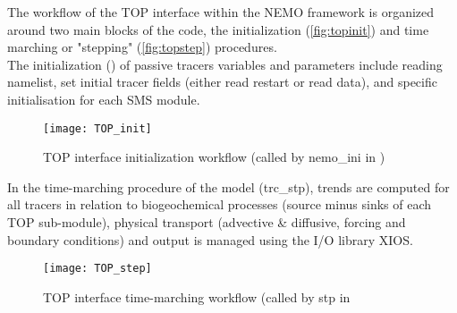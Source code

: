 \documentclass[../main/TOP_manual]{subfiles}
\begin{document}
\pagebreak


The workflow of the TOP interface within the NEMO framework is organized around two main blocks of the code, the initialization (\autoref{fig:topinit}) and time marching or "stepping" (\autoref{fig:topstep}) procedures.\\

The initialization () of passive tracers variables and parameters include reading namelist, set initial tracer fields (either read restart or read data), and specific initialisation for each SMS module.

\begin{figure}[ht]
\begin{center}
\vspace{0cm}
\texttt{[image: TOP\_init]}
\caption{TOP interface initialization workflow (called by nemo\_ini in )}
\label{fig:topinit}
\end{center}
\end{figure}

In the time-marching procedure of the model (trc\_stp), trends are computed for all tracers in relation to biogeochemical processes (source minus sinks of each TOP sub-module), 
physical transport (advective \& diffusive, forcing and boundary conditions) and output is managed using the I/O library XIOS.

\begin{figure}[ht]
\begin{center}
\vspace{0cm}
\texttt{[image: TOP\_step]}
\caption{TOP interface time-marching workflow (called by stp in }
\label{fig:topstep}
\end{center}
\end{figure}
\end{document}
